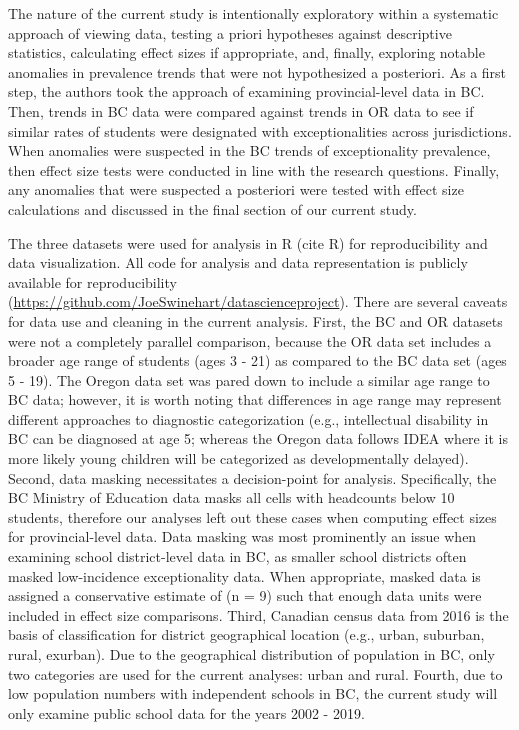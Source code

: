 \documentclass[
  english,
  man]{apa6}
\begin{document}
The nature of the current study is intentionally exploratory within a systematic approach of viewing data, testing a priori hypotheses against descriptive statistics, calculating effect sizes if appropriate, and, finally, exploring notable anomalies in prevalence trends that were not hypothesized a posteriori. As a first step, the authors took the approach of examining provincial-level data in BC. Then, trends in BC data were compared against trends in OR data to see if similar rates of students were designated with exceptionalities across jurisdictions. When anomalies were suspected in the BC trends of exceptionality prevalence, then effect size tests were conducted in line with the research questions. Finally, any anomalies that were suspected a posteriori were tested with effect size calculations and discussed in the final section of our current study.

The three datasets were used for analysis in R (cite R) for reproducibility and data visualization. All code for analysis and data representation is publicly available for reproducibility (\url{https://github.com/JoeSwinehart/datascienceproject}). There are several caveats for data use and cleaning in the current analysis. First, the BC and OR datasets were not a completely parallel comparison, because the OR data set includes a broader age range of students (ages 3 - 21) as compared to the BC data set (ages 5 - 19). The Oregon data set was pared down to include a similar age range to BC data; however, it is worth noting that differences in age range may represent different approaches to diagnostic categorization (e.g., intellectual disability in BC can be diagnosed at age 5; whereas the Oregon data follows IDEA where it is more likely young children will be categorized as developmentally delayed). Second, data masking necessitates a decision-point for analysis. Specifically, the BC Ministry of Education data masks all cells with headcounts below 10 students, therefore our analyses left out these cases when computing effect sizes for provincial-level data. Data masking was most prominently an issue when examining school district-level data in BC, as smaller school districts often masked low-incidence exceptionality data. When appropriate, masked data is assigned a conservative estimate of (n = 9) such that enough data units were included in effect size comparisons. Third, Canadian census data from 2016 is the basis of classification for district geographical location (e.g., urban, suburban, rural, exurban). Due to the geographical distribution of population in BC, only two categories are used for the current analyses: urban and rural. Fourth, due to low population numbers with independent schools in BC, the current study will only examine public school data for the years 2002 - 2019.
\end{document}

